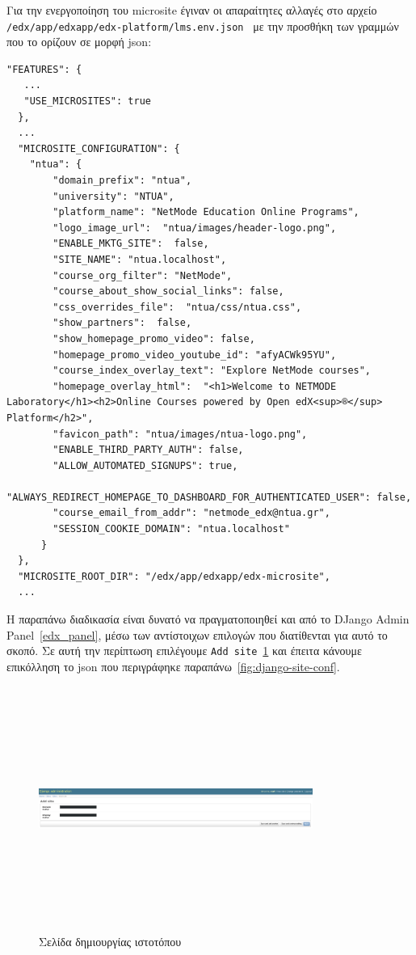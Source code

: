 \documentclass[12pt]{report}
\begin{document}
Για την ενεργοποίηση του \textlatin{microsite} έγιναν οι απαραίτητες αλλαγές στο αρχείο \textlatin{\texttt{/edx/app/edxapp/edx-platform/lms.env.json}}~\cite{microsites_1} με την προσθήκη των γραμμών που το ορίζουν σε μορφή \textlatin{json}:
\begin{Verbatim}
"FEATURES": {
   ...
   "USE_MICROSITES": true
  },
  ...
  "MICROSITE_CONFIGURATION": {
    "ntua": {
        "domain_prefix": "ntua",
        "university": "NTUA",
        "platform_name": "NetMode Education Online Programs",
        "logo_image_url":  "ntua/images/header-logo.png",
        "ENABLE_MKTG_SITE":  false,
        "SITE_NAME": "ntua.localhost",
        "course_org_filter": "NetMode",
        "course_about_show_social_links": false,
        "css_overrides_file":  "ntua/css/ntua.css",
        "show_partners":  false,
        "show_homepage_promo_video": false,
        "homepage_promo_video_youtube_id": "afyACWk95YU",
        "course_index_overlay_text": "Explore NetMode courses",
        "homepage_overlay_html":  "<h1>Welcome to NETMODE Laboratory</h1><h2>Online Courses powered by Open edX<sup>®</sup> Platform</h2>",
        "favicon_path": "ntua/images/ntua-logo.png",
        "ENABLE_THIRD_PARTY_AUTH": false,
        "ALLOW_AUTOMATED_SIGNUPS": true,
        "ALWAYS_REDIRECT_HOMEPAGE_TO_DASHBOARD_FOR_AUTHENTICATED_USER": false,
        "course_email_from_addr": "netmode_edx@ntua.gr",
        "SESSION_COOKIE_DOMAIN": "ntua.localhost"
      }
  },
  "MICROSITE_ROOT_DIR": "/edx/app/edxapp/edx-microsite",
  ...
\end{Verbatim}

Η παραπάνω διαδικασία είναι δυνατό να πραγματοποιηθεί και από το \textlatin{DJango Admin Panel}~\ref{edx_panel}, μέσω των αντίστοιχων επιλογών που διατίθενται για αυτό το σκοπό. Σε αυτή την περίπτωση επιλέγουμε \textlatin{\texttt{Add site}}~\ref{fig:django-new-site} και έπειτα κάνουμε επικόλληση το \textlatin{json} που περιγράφηκε παραπάνω~\ref{fig:django-site-conf}.

\begin{figure}[h]
\centering
\includegraphics[width=0.8\textwidth, height=8cm]{django-new-site}
\caption{Σελίδα δημιουργίας ιστοτόπου}
\label{fig:django-new-site}
\end{figure}
\end{document}
